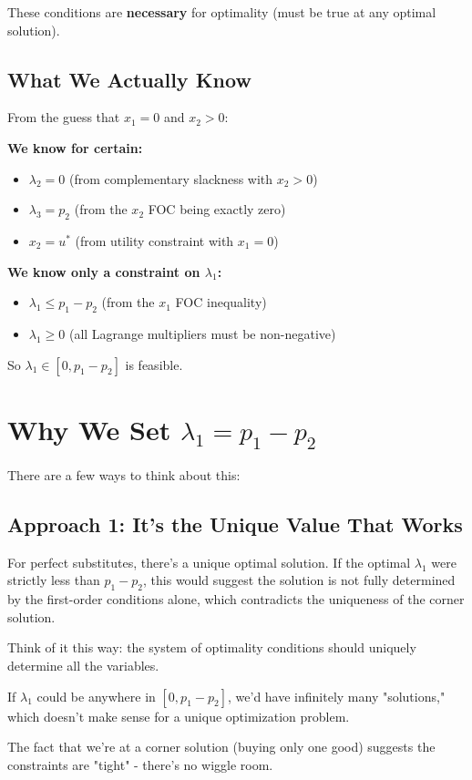 \documentclass[11pt]{article}
\begin{document}
These conditions are \textbf{necessary} for optimality (must be true at any optimal solution).

\subsection{What We Actually Know}

From the guess that $x_1 = 0$ and $x_2 > 0$:

\textbf{We know for certain:}
\begin{itemize}
\item $\lambda_2 = 0$ (from complementary slackness with $x_2 > 0$)
\item $\lambda_3 = p_2$ (from the $x_2$ FOC being exactly zero)
\item $x_2 = u^*$ (from utility constraint with $x_1 = 0$)
\end{itemize}

\textbf{We know only a constraint on $\lambda_1$:}
\begin{itemize}
\item $\lambda_1 \leq p_1 - p_2$ (from the $x_1$ FOC inequality)
\item $\lambda_1 \geq 0$ (all Lagrange multipliers must be non-negative)
\end{itemize}

So $\lambda_1 \in [0, p_1 - p_2]$ is feasible.

\section{Why We Set $\lambda_1 = p_1 - p_2$}

There are a few ways to think about this:

\subsection{Approach 1: It's the Unique Value That Works}

For perfect substitutes, there's a unique optimal solution. If the optimal $\lambda_1$ were strictly less than $p_1 - p_2$, this would suggest the solution is not fully determined by the first-order conditions alone, which contradicts the uniqueness of the corner solution.

\begin{tcolorbox}[colback=blue!5!white,colframe=blue!75!black,title=Intuition]
Think of it this way: the system of optimality conditions should uniquely determine all the variables.

If $\lambda_1$ could be anywhere in $[0, p_1 - p_2]$, we'd have infinitely many "solutions," which doesn't make sense for a unique optimization problem.

The fact that we're at a corner solution (buying only one good) suggests the constraints are "tight" - there's no wiggle room.
\end{tcolorbox}
\end{document}
